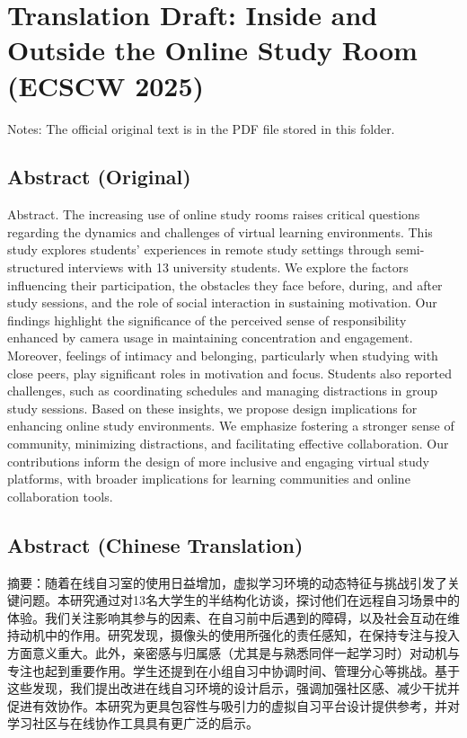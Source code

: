 \documentclass[12pt]{ctexart}
\begin{document}
\section*{Translation Draft: Inside and Outside the Online Study Room (ECSCW 2025)}

Notes: The official original text is in the PDF file stored in this folder.

\subsection*{Abstract (Original)}

Abstract. The increasing use of online study rooms raises critical questions regarding the dynamics and challenges of virtual learning environments. This study explores students’ experiences in remote study settings through semi-structured interviews with 13 university students. We explore the factors influencing their participation, the obstacles they face before, during, and after study sessions, and the role of social interaction in sustaining motivation. Our findings highlight the significance of the perceived sense of responsibility enhanced by camera usage in maintaining concentration and engagement. Moreover, feelings of intimacy and belonging, particularly when studying with close peers, play significant roles in motivation and focus. Students also reported challenges, such as coordinating schedules and managing distractions in group study sessions. Based on these insights, we propose design implications for enhancing online study environments. We emphasize fostering a stronger sense of community, minimizing distractions, and facilitating effective collaboration. Our contributions inform the design of more inclusive and engaging virtual study platforms, with broader implications for learning communities and online collaboration tools.

\subsection*{Abstract (Chinese Translation)}

摘要：随着在线自习室的使用日益增加，虚拟学习环境的动态特征与挑战引发了关键问题。本研究通过对13名大学生的半结构化访谈，探讨他们在远程自习场景中的体验。我们关注影响其参与的因素、在自习前中后遇到的障碍，以及社会互动在维持动机中的作用。研究发现，摄像头的使用所强化的责任感知，在保持专注与投入方面意义重大。此外，亲密感与归属感（尤其是与熟悉同伴一起学习时）对动机与专注也起到重要作用。学生还提到在小组自习中协调时间、管理分心等挑战。基于这些发现，我们提出改进在线自习环境的设计启示，强调加强社区感、减少干扰并促进有效协作。本研究为更具包容性与吸引力的虚拟自习平台设计提供参考，并对学习社区与在线协作工具具有更广泛的启示。
\end{document}
